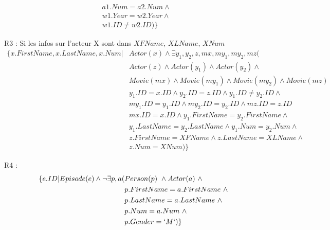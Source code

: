 \documentclass[a4paper,12pt]{article}
\begin{document}
\begin{list}{-}{}
\begin{align*}
      & a1.Num = a2.Num \wedge \\
      & w1.Year = w2.Year \wedge \\
      & w1.ID \neq w2.ID ) \}
    \end{align*}
  \item R3 :
    Si les infos sur l'acteur X sont dans $XFName$, $XLName$, $XNum$
    \begin{align*}
      \{ x.FirstName, x.LastName, x.Num | &Actor(x) \wedge \exists y_1, y_2, z, mx, my_1, my_2, mz ( \\
      & Actor(z) \wedge Actor(y_1) \wedge Actor(y_2) \wedge \\
      & Movie(mx) \wedge Movie(my_1) \wedge Movie(my_2) \wedge Movie(mz) \\
      & y_1.ID = x.ID \wedge y_2.ID = z.ID \wedge y_1.ID \neq y_2.ID \wedge \\
      & my_1.ID = y_1.ID \wedge my_2.ID = y_2.ID \wedge mz.ID = z.ID \\
      & mx.ID = x.ID \wedge y_1.FirstName = y_2.FirstName \wedge \\
      & y_1.LastName = y_2.LastName \wedge y_1.Num = y_2.Num \wedge \\
      & z.FirstName = XFName \wedge z.LastName = XLName \wedge \\
      & z.Num = XNum)\}
    \end{align*}
  \item R4 :
    \begin{align*}
      \{ e.ID | Episode(e) \wedge \lnot \exists p, a (&Person(p) ~\wedge Actor(a) ~\wedge \\
        & p.FirstName = a.FirstName ~\wedge \\
        & p.LastName = a.LastName ~\wedge \\
        & p.Num = a.Num ~\wedge \\
        & p.Gender = `M`)\}
    \end{align*}
\end{list}
\end{document}
